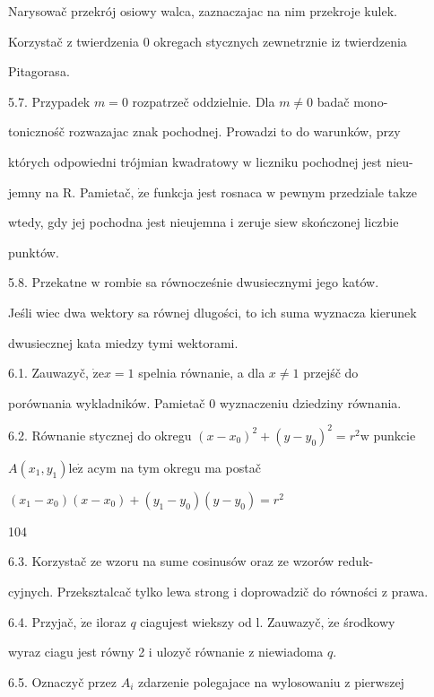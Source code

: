 \documentclass[a4paper,12pt]{article}
\begin{document}
Narysowač przekrój osiowy walca, zaznaczajac na nim przekroje kulek.

Korzystač $\mathrm{z}$ twierdzenia $0$ okregach stycznych zewnetrznie $\mathrm{i}\mathrm{z}$ twierdzenia

Pitagorasa.

5.7. Przypadek $m=0$ rozpatrzeč oddzielnie. Dla $m\neq 0$ badač mono-

tonicznośč rozwazajac znak pochodnej. Prowadzi to do warunków, przy

których odpowiedni trójmian kwadratowy $\mathrm{w}$ liczniku pochodnej jest nieu-

jemny na R. Pamietač, $\dot{\mathrm{z}}\mathrm{e}$ funkcja jest rosnaca $\mathrm{w}$ pewnym przedziale takze

wtedy, gdy jej pochodna jest nieujemna $\mathrm{i}$ zeruje $\mathrm{s}\mathrm{i}\mathrm{e}\mathrm{w}$ skończonej liczbie

punktów.

5.8. Przekatne $\mathrm{w}$ rombie sa równocześnie dwusiecznymi jego katów.

Jeśli wiec dwa wektory sa równej dlugości, to ich suma wyznacza kierunek

dwusiecznej kata miedzy tymi wektorami.

6.1. Zauwazyč, $\dot{\mathrm{z}}\mathrm{e} x = 1$ spelnia równanie, a dla $x \neq 1$ przejśč do

porównania wykladników. Pamietač $0$ wyznaczeniu dziedziny równania.

6.2. Równanie stycznej do okregu $(x-x_{0})^{2}+(y-y_{0})^{2}=r^{2}\mathrm{w}$ punkcie

$A(x_{1},y_{1})\mathrm{l}\mathrm{e}\dot{\mathrm{z}}$ acym na tym okregu ma postač

$(x_{1}-x_{0})(x-x_{0})+(y_{1}-y_{0})(y-y_{0})=r^{2}$





104

6.3. Korzystač ze wzoru na sume cosinusów oraz ze wzorów reduk-

cyjnych. Przeksztalcač tylko lewa strong $\mathrm{i}$ doprowadzič do równości $\mathrm{z}$ prawa.

6.4. Przyjač, $\dot{\mathrm{z}}\mathrm{e}$ iloraz $q$ ciagujest wiekszy od l. Zauwazyč, $\dot{\mathrm{z}}\mathrm{e}$ środkowy

wyraz ciagu jest równy 2 $\mathrm{i}$ ulozyč równanie $\mathrm{z}$ niewiadoma $q.$

6.5. Oznaczyč przez $A_{i}$ zdarzenie polegajace na wylosowaniu $\mathrm{z}$ pierwszej
\end{document}
